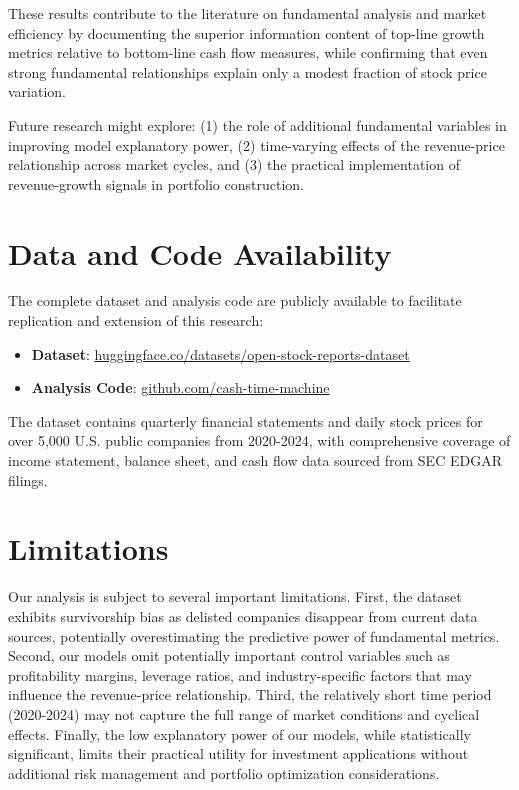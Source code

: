 \documentclass[11pt]{article}
\begin{document}
These results contribute to the literature on fundamental analysis and market efficiency by documenting the superior information content of top-line growth metrics relative to bottom-line cash flow measures, while confirming that even strong fundamental relationships explain only a modest fraction of stock price variation.

Future research might explore: (1) the role of additional fundamental variables in improving model explanatory power, (2) time-varying effects of the revenue-price relationship across market cycles, and (3) the practical implementation of revenue-growth signals in portfolio construction.

\section*{Data and Code Availability}

The complete dataset and analysis code are publicly available to facilitate replication and extension of this research:

\begin{itemize}
\item \textbf{Dataset}: \href{https://huggingface.co/datasets/almogtavor/open-stock-reports-dataset}{huggingface.co/datasets/open-stock-reports-dataset}
\item \textbf{Analysis Code}: \href{https://github.com/almogtavor/cash-time-machine}{github.com/cash-time-machine}
\end{itemize}

The dataset contains quarterly financial statements and daily stock prices for over 5,000 U.S. public companies from 2020-2024, with comprehensive coverage of income statement, balance sheet, and cash flow data sourced from SEC EDGAR filings.

\section*{Limitations}

Our analysis is subject to several important limitations. First, the dataset exhibits survivorship bias as delisted companies disappear from current data sources, potentially overestimating the predictive power of fundamental metrics. Second, our models omit potentially important control variables such as profitability margins, leverage ratios, and industry-specific factors that may influence the revenue-price relationship. Third, the relatively short time period (2020-2024) may not capture the full range of market conditions and cyclical effects. Finally, the low explanatory power of our models, while statistically significant, limits their practical utility for investment applications without additional risk management and portfolio optimization considerations.
\end{document}
